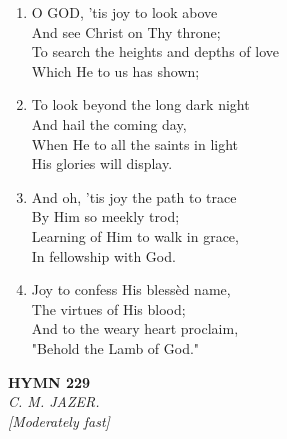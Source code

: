 \documentclass[11pt,a4paper]{article}
\begin{document}
\begin{enumerate}
    \item O GOD, 'tis joy to look above \\
            And see Christ on Thy throne; \\
        To search the heights and depths of love \\
            Which He to us has shown;

    \item To look beyond the long dark night \\
            And hail the coming day, \\
        When He to all the saints in light \\
            His glories will display.

    \item And oh, 'tis joy the path to trace \\
            By Him so meekly trod; \\
        Learning of Him to walk in grace, \\
            In fellowship with God.

    \item Joy to confess His bless\`ed name, \\
            The virtues of His blood; \\
        And to the weary heart proclaim, \\
            "Behold the Lamb of God."

\end{enumerate}

\newpage
\begin{center}
    {\Large \textbf{HYMN 229}}
    \\
    \textit{C. M. JAZER.}
    \\
    \textit{\small [Moderately fast]}
\end{center}
\vspace{1em}
\end{document}
